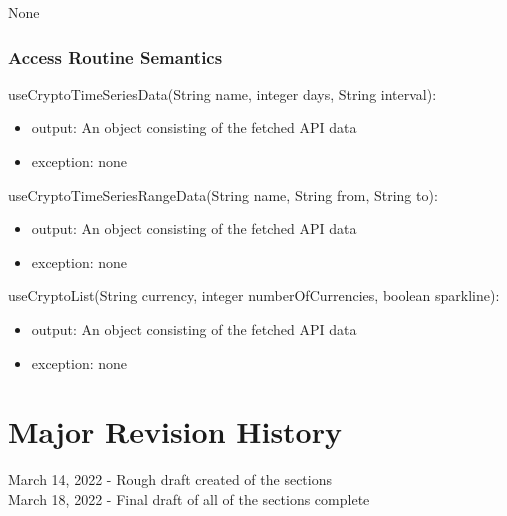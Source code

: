 \documentclass[12pt]{article}
\begin{document}
None

\subsubsection{Access Routine Semantics}


\noindent useCryptoTimeSeriesData(String name, integer days, String interval):
\begin{itemize}
\item output: An object consisting of the fetched API data
\item exception: none
\end{itemize}

\noindent useCryptoTimeSeriesRangeData(String name, String from, String to):
\begin{itemize}
\item output: An object consisting of the fetched API data
\item exception: none
\end{itemize}

\noindent useCryptoList(String currency, integer numberOfCurrencies, boolean sparkline):
\begin{itemize}
\item output: An object consisting of the fetched API data
\item exception: none
\end{itemize}

\newpage

\section{Major Revision History}
March 14, 2022 - Rough draft created of the sections \\
March 18, 2022 - Final draft of all of the sections complete \\
\end{document}
